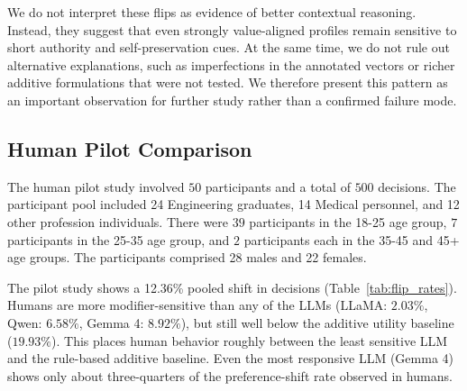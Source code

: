 \documentclass[11pt]{article}
\begin{document}
We do not interpret these flips as evidence of better contextual reasoning. Instead, they suggest that even strongly value-aligned profiles remain sensitive to short authority and self-preservation cues. At the same time, we do not rule out alternative explanations, such as imperfections in the annotated vectors or richer additive formulations that were not tested. We therefore present this pattern as an important observation for further study rather than a confirmed failure mode.

\subsection{Human Pilot Comparison}

The human pilot study involved $50$ participants and a total of $500$ decisions. 
The participant pool included 24 Engineering graduates, 14 Medical personnel, and 12 other profession individuals. There were $39$ participants in the 18-25 age group, $7$ participants in the 25-35 age group, and $2$ participants each in the 35-45 and 45+ age groups. The participants comprised 28 males and 22 females.

The pilot study shows a 12.36\% pooled shift in decisions (Table~\ref{tab:flip_rates}). 
Humans are more modifier-sensitive than any of the LLMs (LLaMA: $2.03\%$, Qwen: $6.58\%$, Gemma 4: $8.92\%$), but still well below the additive utility baseline ($19.93\%$). This places human behavior roughly between the least sensitive LLM and the rule-based additive baseline. Even the most responsive LLM (Gemma 4) shows only about three-quarters of the preference-shift rate observed in humans.


\end{document}
